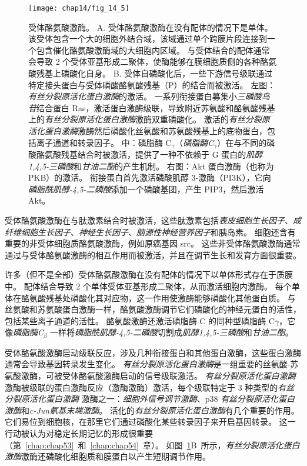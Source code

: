 \begin{figure}[htbp]
	\centering
	\texttt{[image: chap14/fig\_14\_5]}
	\caption{受体酪氨酸激酶。 
		A. 受体酪氨酸激酶在没有配体的情况下是单体。
		该受体包含一个大的细胞外结合域，该域通过单个跨膜片段连接到一个包含催化酪氨酸激酶域的大细胞内区域。
		与受体结合的配体通常会导致 2 个受体亚基形成二聚体，使酶能够在膜细胞质侧的各种酪氨酸残基上磷酸化自身。
		B. 受体自磷酸化后，一些下游信号级联通过特定接头蛋白与受体磷酸酪氨酸残基（P）的结合而被激活。
		左图：\textit{有丝分裂原活化蛋白激酶}的激活。
		一系列衔接蛋白募集小\textit{三磷酸鸟苷}结合蛋白 Ras，激活蛋白激酶级联，导致附近苏氨酸和酪氨酸残基上的\textit{有丝分裂原活化蛋白激酶}激酶双重磷酸化。
		激活的\textit{有丝分裂原活化蛋白激酶}激酶然后磷酸化丝氨酸和苏氨酸残基上的底物蛋白，包括离子通道和转录因子。
		中：磷脂酶 C$_{\gamma}$（\textit{磷脂酶C}$_{\gamma}$）在与不同的磷酸酪氨酸残基结合时被激活，提供了一种不依赖于 G 蛋白的\textit{肌醇1,4,5-三磷酸}和\textit{甘油二酯}的产生机制。
		右图：Akt 蛋白激酶（也称为 PKB）的激活。
		衔接蛋白首先激活磷酸肌醇 3-激酶（PI3K），它向\textit{磷脂酰肌醇-4,5-二磷酸}添加一个磷酸基团，产生 PIP3，然后激活 Akt。}
	\label{fig:14_5}
\end{figure}


受体酪氨酸激酶在与肽激素结合时被激活，这些肽激素包括\textit{表皮细胞生长因子}、\textit{成纤维细胞生长因子}、\textit{神经生长因子}、\textit{脑源性神经营养因子}和胰岛素。
细胞还含有重要的非受体细胞质酪氨酸激酶，例如原癌基因 src。
这些非受体酪氨酸激酶通常通过与受体酪氨酸激酶的相互作用而被激活，并且在调节生长和发育方面很重要。


许多（但不是全部）受体酪氨酸激酶在没有配体的情况下以单体形式存在于质膜中。
配体结合导致 2 个单体受体亚基形成二聚体，从而激活细胞内激酶。
每个单体在酪氨酸残基处磷酸化其对应物，这一作用使激酶能够磷酸化其他蛋白质。
与丝氨酸和苏氨酸蛋白激酶一样，酪氨酸激酶调节它们磷酸化的神经元蛋白的活性，包括某些离子通道的活性。
酪氨酸激酶还激活磷脂酶 C 的同种型磷脂酶 C$\gamma$，它像\textit{磷脂酶C}$_\beta$ 一样将\textit{磷脂酰肌醇-4,5-二磷酸}切割成\textit{肌醇1,4,5-三磷酸}和\textit{甘油二酯}。


受体酪氨酸激酶启动级联反应，涉及几种衔接蛋白和其他蛋白激酶，这些蛋白激酶通常会导致基因转录发生变化。
\textit{有丝分裂原活化蛋白激酶}是一组重要的丝氨酸-苏氨酸激酶，可被受体酪氨酸激酶启动的信号级联激活。
\textit{有丝分裂原活化蛋白激酶}激酶被级联的蛋白激酶反应（激酶激酶）激活，每个级联特定于 3 种类型的\textit{有丝分裂原活化蛋白激酶} 激酶之一：\textit{细胞外信号调节激酶}、p38 \textit{有丝分裂原活化蛋白激酶}和\textit{c-Jun氨基末端激酶}。
活化的\textit{有丝分裂原活化蛋白激酶}有几个重要的作用。
它们易位到细胞核，在那里它们通过磷酸化某些转录因子来开启基因转录。
这一行动被认为对稳定长期记忆的形成很重要（第~\ref{chap:chap53}~和~\ref{chap:chap54}~章）。
如图~\ref{fig:14_5}B~所示，\textit{有丝分裂原活化蛋白激酶}激酶还磷酸化细胞质和膜蛋白以产生短期调节作用。



